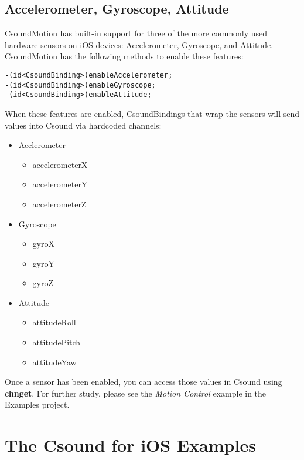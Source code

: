 \documentclass[11pt]{article}
\begin{document}
\subsection{Accelerometer, Gyroscope, Attitude}

CsoundMotion has built-in support for three of the more commonly used hardware sensors on iOS devices: Accelerometer, Gyroscope, and Attitude. CsoundMotion has the following methods to enable these features:


\begin{lstlisting}[caption=CsoundMotion Hardware Sensor Methods]
-(id<CsoundBinding>)enableAccelerometer;
-(id<CsoundBinding>)enableGyroscope;
-(id<CsoundBinding>)enableAttitude;
\end{lstlisting}

When these features are enabled, CsoundBindings that wrap the sensors will send values into Csound via hardcoded channels:

\begin{itemize}

\item Acclerometer
\begin{itemize}
\item accelerometerX
\item accelerometerY
\item accelerometerZ
\end{itemize}

\item Gyroscope
\begin{itemize}
\item gyroX
\item gyroY
\item gyroZ
\end{itemize}

\item Attitude
\begin{itemize}
\item attitudeRoll
\item attitudePitch
\item attitudeYaw
\end{itemize}

\end{itemize}

Once a sensor has been enabled, you can access those values in Csound using \textbf{chnget}. For further study, please see the \emph{Motion Control} example in the Examples project.


\section{The Csound for iOS Examples}
\end{document}
